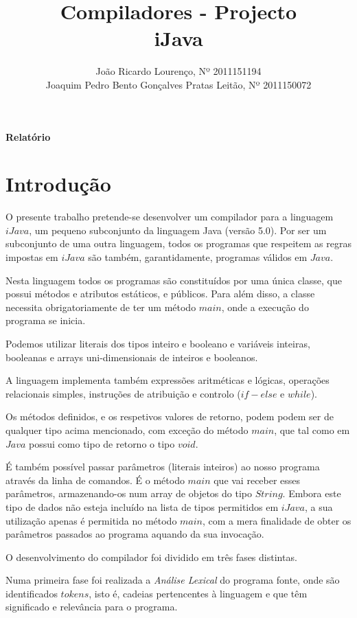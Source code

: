 \documentclass[11pt,a4paper]{article}
\title{\bf{Compiladores - Projecto}\vspace{50mm}\\iJava\vspace{80mm}}
\author{
João Ricardo Lourenço, Nº 2011151194\\
Joaquim Pedro Bento Gonçalves Pratas Leitão, Nº 2011150072}
\begin{document}
\maketitle
\centerline{\textbf{Relatório}}
\pagebreak

\printindex

\renewcommand*\contentsname{Índice}
\tableofcontents

\pagebreak

\section{Introdução}

O presente trabalho pretende-se desenvolver um compilador para a linguagem $iJava$, um pequeno subconjunto da linguagem Java (versão 5.0). Por ser um subconjunto de uma outra linguagem, todos os programas que respeitem as regras impostas em $iJava$ são também, garantidamente, programas válidos em $Java$.

Nesta linguagem todos os programas são constituídos por uma única classe, que possui métodos e atributos estáticos, e públicos. Para além disso, a classe necessita obrigatoriamente de ter um método $main$, onde a execução do programa se inicia. 

Podemos utilizar literais dos tipos inteiro e booleano e variáveis inteiras, booleanas e arrays uni-dimensionais de inteiros e booleanos.

A linguagem implementa também expressões aritméticas e lógicas, operações relacionais simples, instruções de atribuição e controlo ($if-else$ e $while$).

Os métodos definidos, e os respetivos valores de retorno, podem podem ser de qualquer tipo acima mencionado, com exceção do método $main$, que tal como em $Java$ possui como tipo de retorno o tipo $void$.

É também possível passar parâmetros (literais inteiros) ao nosso programa através da linha de comandos. É o método $main$ que vai receber esses parâmetros, armazenando-os num array de objetos do tipo $String$. Embora este tipo de dados não esteja incluído na lista de tipos permitidos em $iJava$, a sua utilização apenas é permitida no método $main$, com a mera finalidade de obter os parâmetros passados ao programa aquando da sua invocação.

O desenvolvimento do compilador foi dividido em três fases distintas.

Numa primeira fase foi realizada a \emph{Análise Lexical} do programa fonte, onde são identificados $tokens$, isto é, cadeias pertencentes à linguagem e que têm significado e relevância para o programa.
\end{document}

